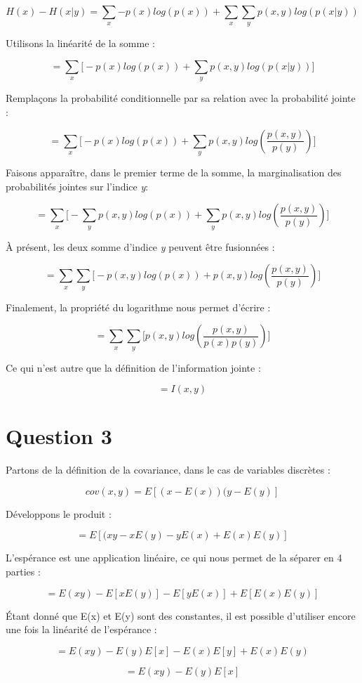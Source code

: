\documentclass{article}
\begin{document}
$$H(x) - H(x|y) = \sum_{x}{-p(x)log(p(x))} + \sum_{x}{\sum_{y}{p(x,y)log(p(x|y))}}$$

Utilisons la linéarité de la somme :

$$= \sum_{x}{\Big[-p(x)log(p(x)) + \sum_{y}{p(x,y)log(p(x|y))}\Big]}$$

Remplaçons la probabilité conditionnelle par sa relation avec la probabilité jointe :

$$= \sum_{x}{\Big[-p(x)log(p(x)) + \sum_{y}{p(x,y)log(\frac{p(x,y)}{p(y)})}\Big]}$$

Faisons apparaître, dans le premier terme de la somme, la marginalisation des probabilités jointes sur l'indice \textit{y}:

$$= \sum_{x}{\Big[-\sum_{y}{p(x,y)log(p(x))} + \sum_{y}{p(x,y)log(\frac{p(x,y)}{p(y)})}\Big]}$$

À présent, les deux somme d'indice \textit{y} peuvent être fusionnées :

$$= \sum_{x}{\sum_{y}{\Big[-p(x,y)log(p(x))+p(x,y)log(\frac{p(x,y)}{p(y)})\Big]}}$$

Finalement, la propriété du logarithme nous permet d'écrire :

$$= \sum_{x}{\sum_{y}{\Big[p(x,y)log(\frac{p(x,y)}{p(x)p(y)})\Big]}}$$

Ce qui n'est autre que la définition de l'information jointe :

$$\boxed{= I(x,y)}$$

\section*{Question 3}

Partons de la définition de la covariance, dans le cas de variables discrètes :

$$cov(x,y) = E[(x-E(x))(y-E(y)]$$

Développons le produit :

$$= E[(xy - xE(y) - yE(x) + E(x)E(y)]$$

L'espérance est une application linéaire, ce qui nous permet de la séparer en 4 parties :

$$= E(xy) - E[xE(y)] - E[yE(x)] + E[E(x)E(y)]$$

Étant donné que E(x) et E(y) sont des constantes, il est possible d'utiliser encore une fois la linéarité de l'espérance :

$$= E(xy) - E(y)E[x] - E(x)E[y] + E(x)E(y)$$

$$\boxed{= E(xy) - E(y)E[x]}$$
\end{document}
